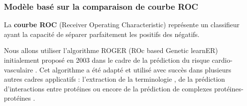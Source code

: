 \subsubsection{Modèle basé sur la comparaison de courbe ROC}\label{roc}





La  \textbf{courbe ROC} (Receiver Operating Characteristic) \cite{RocLift:2006,ROC:1978} représente un classifieur ayant la capacité de séparer parfaitement les positifs des négatifs.

Nous allons utiliser l'algorithme ROGER (ROc based Genetic learnER) initialement proposé en 2003 dans le cadre de la prédiction du risque cardio-vasculaire \cite{SebagAzeLucas:ICDM2003,SebagLucasAze:EA2003,Challenge_PKDD03}. Cet algorithme a été adapté et utilisé avec succès dans plusieurs autres cadres applicatifs : l'extraction de la terminologie \cite{Aze_ROCML:2005}, de la prédiction d'interactions entre protéines \cite{deVienne-Aze_PLoSOne:2012} ou encore de la prédiction de complexes protéines-protéines \cite{PLoSOne:2011}.

